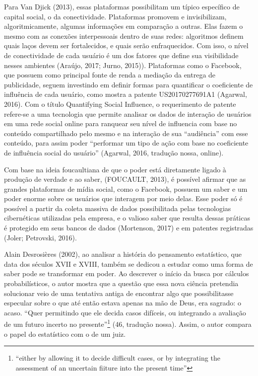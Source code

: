 Para Van Djick (2013), essas plataformas possibilitam um típico
específico de capital social, o da conectividade. Plataformas promovem e
invisibilizam, algoritmicamente, algumas informações em comparação a
outras. Elas fazem o mesmo com as conexões interpessoais dentro de suas
redes: algoritmos definem quais laços devem ser fortalecidos, e quais
serão enfraquecidos. Com isso, o nível de conectividade de cada usuário
é um dos fatores que define sua visibilidade nesses ambientes (Araújo,
2017; Jurno, 2015)). Plataformas como o Facebook, que possuem como
principal fonte de renda a mediação da entrega de publicidade, seguem
investindo em definir formas para quantificar o coeficiente de
influência de cada usuário, como mostra a patente US20170277691A1
(Agarwal, 2016). Com o título Quantifying Social Influence, o
requerimento de patente refere-se a uma tecnologia que permite analisar
os dados de interação de usuários em uma rede social online para
ranquear seu nível de influencia com base no conteúdo compartilhado pelo
mesmo e na interação de sua ``audiência'' com esse conteúdo, para assim
poder ``performar um tipo de ação com base no coeficiente de influência
social do usuário'' (Agarwal, 2016, tradução nossa, online).

Com base na ideia foucaultiana de que o poder está diretamente ligado à
produção de verdade e ao saber, (FOUCAULT, 2013),
é possível afirmar que as grandes plataformas de mídia social, como o
Facebook, possuem um saber e um poder enorme sobre os usuários que
interagem por meio delas. Esse poder só é possível a partir da coleta
massiva de dados possibilitada pelas tecnologias cibernéticas utilizadas
pela empresa, e o valioso saber que resulta dessas práticas é protegido
em seus bancos de dados (Mortenson, 2017) e em patentes registradas
(Joler; Petrovski, 2016).

Alain Desrosières (2002), ao analisar a história do pensamento estatístico, que data dos séculos
XVII e XVIII, também se dedicou a estudar como uma forma de saber pode
se transformar em poder. Ao descrever o início da busca por cálculos
probabilísticos, o autor mostra que a questão que essa nova ciência
pretendia solucionar veio de uma tentativa antiga de encontrar algo que
possibilitasse especular sobre o que até então estava apenas na mão de
Deus, era sagrado: o acaso. ``Quer permitindo que ele decida casos
difíceis, ou integrando a avaliação de um futuro incerto no
presente''\footnote{``either by allowing it to decide difficult cases,
  or by integrating the assessment of an uncertain fiiture into the
  present time''} (46, tradução nossa). Assim, o autor compara o papel
do estatístico com o de um juiz.

